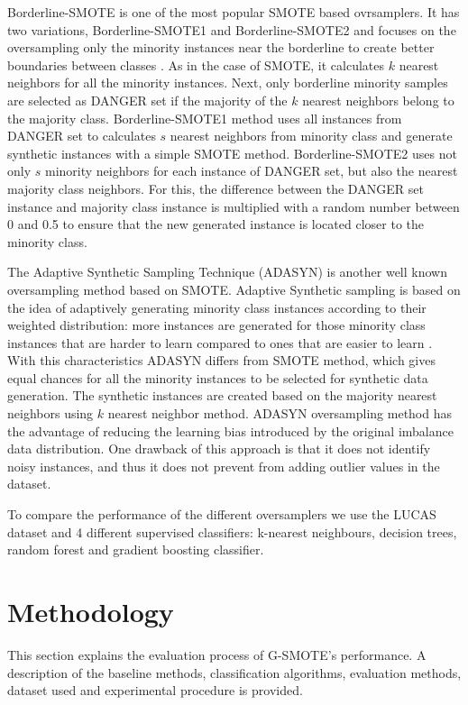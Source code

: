 \documentclass[parskip=full]{scrartcl}
\begin{document}
Borderline-SMOTE is one of the most popular SMOTE based ovrsamplers. It has two
variations, Borderline-SMOTE1 and Borderline-SMOTE2 and focuses on the
oversampling only the minority instances near the borderline to create better
boundaries between classes \cite{Han2005}. As in the case of SMOTE, it
calculates $k$ nearest neighbors for all the minority instances. Next, only
borderline minority samples are selected as DANGER set if the majority of the
$k$ nearest neighbors belong to the majority class. Borderline-SMOTE1 method
uses all instances from DANGER set to calculates $s$ nearest neighbors from
minority class and generate synthetic instances with a simple SMOTE method.
Borderline-SMOTE2 uses not only $s$ minority neighbors for each instance of
DANGER set, but also the nearest majority class neighbors. For this, the
difference between the DANGER set instance and majority class instance is
multiplied with a random number between 0 and 0.5 to ensure that the new
generated instance is located closer to the minority class.

The Adaptive Synthetic Sampling Technique (ADASYN) is another well known
oversampling method based on SMOTE. Adaptive Synthetic sampling is based on the
idea of adaptively generating minority class instances according to their
weighted distribution: more instances are generated for those minority class
instances that are harder to learn compared to ones that are easier to learn
\cite{HaiboHe2008}. With this characteristics ADASYN differs from SMOTE method,
which gives equal chances for all the minority instances to be selected for
synthetic data generation. The synthetic instances are created based on the
majority nearest neighbors using $k$ nearest neighbor method. ADASYN
oversampling method has the advantage of reducing the learning bias introduced
by the original imbalance data distribution. One drawback of this approach is
that it does not identify noisy instances, and thus it does not prevent from
adding outlier values in the dataset.

To compare the performance of the different oversamplers we use the LUCAS
dataset and 4 different supervised classifiers: k-nearest neighbours, decision
trees, random forest and gradient boosting classifier. 

\section{Methodology}

This section explains the evaluation process of G-SMOTE's performance. A
description of the baseline methods, classification algorithms, evaluation
methods, dataset used and experimental procedure is provided.
\end{document}
